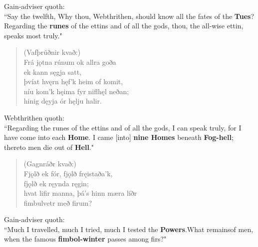 \bvb Gain-adviser quoth: \\ “Say the twelfth, Why thou, Webthrithen, should know all the fates of the \textbf{Tues}\footnotemark[73]? Regarding the \textbf{runes} of the ettins and of all the gods, thou, the all-wise ettin, speaks most truly." \\

\begin{verse}
(Vafþrúðnir kvað:) \\%
\bva Frá jǫtna rúnum \hld ok allra goða \\%
\ind ek kann sęgja satt, \\%
þvíat hvęrn hęf'k \hld heim of komit, \\%
níu kom'k hęima \hld fyr niflhęl neðan; \\%
\ind hinig dęyja ór hęlju halir.\\%
\end{verse}

\bvb Webthrithen quoth: \\ “Regarding the runes of the ettins and of all the gods, I can speak truly, for I have come into each \textbf{Home}. I came [into] \textbf{nine Homes} beneath \textbf{Fog-hell}; thereto men die out of \textbf{Hell}\footnotemark[75]." \\

\begin{verse}
(Gagnráðr kvað:) \\%
\bva Fjǫlð ek fór, \hld fjǫlð fręistaða'k, \\%
\ind fjǫlð ek ręynda ręgin; \\%
hvat lifir manna, \hld þá's hinn mæra líðr \\%
\ind fimbulvetr með firum?\\%
\end{verse}

\bvb Gain-adviser quoth: \\ “Much I travelled, much I tried, much I tested the \textbf{Powers}.\footnotemark[80] What remains\footnotemark[79] of men, when the famous \textbf{fimbol-winter} passes among firs\footnotemark[81]?" \\

